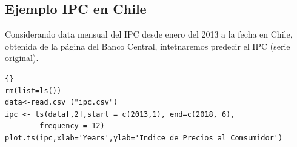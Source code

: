 \subsection{Ejemplo IPC en Chile}
Considerando data mensual del IPC desde enero del 2013 a la fecha en Chile, obtenida de la p\'agina del Banco Central, intetnaremos predecir el IPC (serie original).
%
\begin{lstlisting}[title={‘Código R: Ejemplo IPC en Chile’},basicstyle=\ttfamily]{}
rm(list=ls())
data<-read.csv ("ipc.csv")
ipc <- ts(data[,2],start = c(2013,1), end=c(2018, 6),
		frequency = 12)
plot.ts(ipc,xlab='Years',ylab='Indice de Precios al Comsumidor')
\end{lstlisting}

